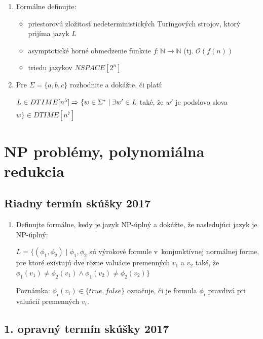 \documentclass[11pt,a4paper]{article}
\begin{document}
		\begin{enumerate}
			\item Formálne definujte:

			\begin{itemize}
				\item priestorovú zložitosť nedeterministických Turingových strojov, ktorý prijíma jazyk $L$
				\item asymptotické horné obmedzenie funkcie $f: \mathbb{N} \rightarrow \mathbb{N}$ (tj. $\mathcal{O}(f(n))$
				\item triedu jazykov $NSPACE[2^n]$
			\end{itemize}

			\item Pre $\Sigma = \{a,b,c\}$ rozhodnite a dokážte, či platí:
	
			$L \in DTIME[n^5] \xRightarrow[]{} \{ w \in \Sigma^* \mid \exists w' \in L$ také, že $w'$ je podslovo slova $w\} \in DTIME[n^7]$
		\end{enumerate}	

	\section{NP problémy, polynomiálna redukcia}

		\subsection{Riadny termín skúšky 2017}

		\begin{enumerate}
			\item Definujte formálne, kedy je jazyk NP-úplný a dokážte, že nasledujúci jazyk je NP-úplný:
	
			$L = \{(\phi_1, \phi_2) \mid \phi_1, \phi_2$ sú výrokové formule v~konjunktívnej normálnej forme, pre ktoré existujú dve rôzne valuácie premenných $v_1$ a $v_2$ také, že $\phi_1(v_1) \neq \phi_2(v_1) \land \phi_1(v_2) \neq \phi_2(v_2)\}$
	
			Poznámka: $\phi_i(v_i) \in \{true, false\}$ označuje, či je formula $\phi_i$ pravdivá pri valuácií premenných $v_i$.
		\end{enumerate}	

		\subsection{1. opravný termín skúšky 2017}
\end{document}

